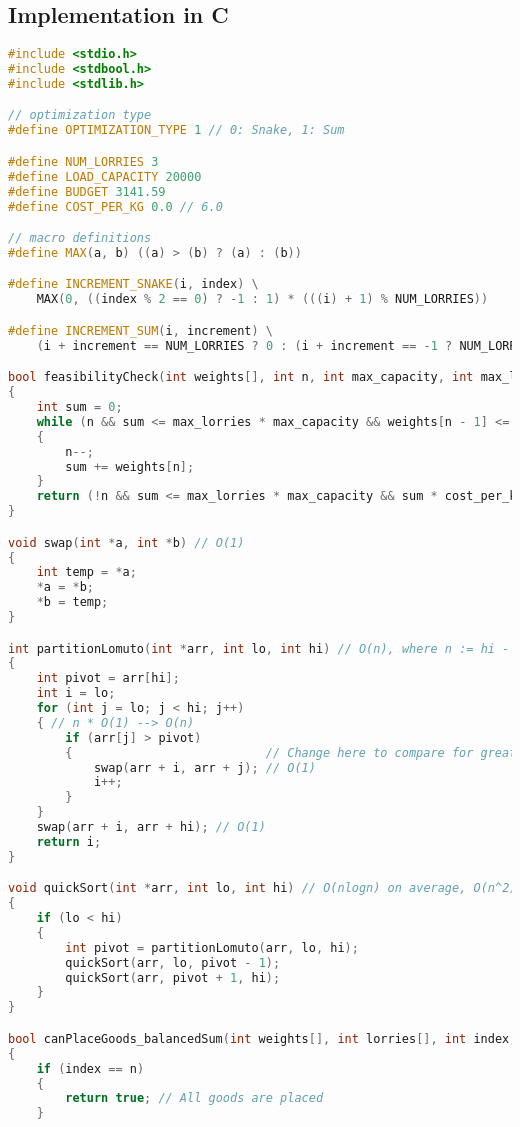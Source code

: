 \documentclass{article}
\begin{document}
\subsection{Implementation in C}
\begin{lstlisting}[language=C++, caption=Implementation in C of PseudoCode \ref{algo:main}., label=lst:code1]
#include <stdio.h>
#include <stdbool.h>
#include <stdlib.h>

// optimization type
#define OPTIMIZATION_TYPE 1 // 0: Snake, 1: Sum

#define NUM_LORRIES 3
#define LOAD_CAPACITY 20000
#define BUDGET 3141.59
#define COST_PER_KG 0.0 // 6.0

// macro definitions
#define MAX(a, b) ((a) > (b) ? (a) : (b))

#define INCREMENT_SNAKE(i, index) \
    MAX(0, ((index % 2 == 0) ? -1 : 1) * (((i) + 1) % NUM_LORRIES))

#define INCREMENT_SUM(i, increment) \
    (i + increment == NUM_LORRIES ? 0 : (i + increment == -1 ? NUM_LORRIES - 1 : i + increment))

bool feasibilityCheck(int weights[], int n, int max_capacity, int max_lorries, double budget, double cost_per_kg)
{
    int sum = 0;
    while (n && sum <= max_lorries * max_capacity && weights[n - 1] <= max_capacity && sum * cost_per_kg <= budget)
    {
        n--;
        sum += weights[n];
    }
    return (!n && sum <= max_lorries * max_capacity && sum * cost_per_kg <= budget);
}

void swap(int *a, int *b) // O(1)
{
    int temp = *a;
    *a = *b;
    *b = temp;
}

int partitionLomuto(int *arr, int lo, int hi) // O(n), where n := hi - lo
{
    int pivot = arr[hi];
    int i = lo;
    for (int j = lo; j < hi; j++)
    { // n * O(1) --> O(n)
        if (arr[j] > pivot)
        {                           // Change here to compare for greater than
            swap(arr + i, arr + j); // O(1)
            i++;
        }
    }
    swap(arr + i, arr + hi); // O(1)
    return i;
}

void quickSort(int *arr, int lo, int hi) // O(nlogn) on average, O(n^2) in worst case
{
    if (lo < hi)
    {
        int pivot = partitionLomuto(arr, lo, hi);
        quickSort(arr, lo, pivot - 1);
        quickSort(arr, pivot + 1, hi);
    }
}

bool canPlaceGoods_balancedSum(int weights[], int lorries[], int index, int n, int max_capacity, bool selected[][n])
{
    if (index == n)
    {
        return true; // All goods are placed
    }


\end{lstlisting}
\end{document}
